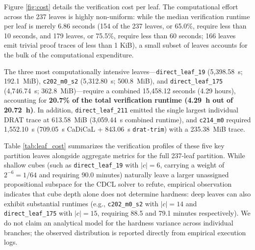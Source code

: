 \documentclass[11pt,a4paper]{article}
\theoremstyle{definition}
\begin{document}
Figure \ref{fig:cost} details the verification cost per leaf. The computational effort across the 237 leaves is highly non-uniform: while the median verification runtime per leaf is merely 6.86 seconds (154 of the 237 leaves, or 65.0\%, require less than 10 seconds, and 179 leaves, or 75.5\%, require less than 60 seconds; 166 leaves emit trivial proof traces of less than 1 KiB), a small subset of leaves accounts for the bulk of the computational expenditure. 

The three most computationally intensive leaves---\texttt{direct\_leaf\_19} (5,398.58~s; 192.1~MiB), \texttt{c202\_m0\_s2} (5,312.80~s; 500.8~MiB), and \texttt{direct\_leaf\_175} (4,746.74~s; 362.8~MiB)---require a combined 15,458.12 seconds (4.29 hours), accounting for \textbf{20.7\% of the total verification runtime (4.29~h out of 20.72~h)}. In addition, \texttt{direct\_leaf\_211} emitted the single largest individual DRAT trace at 613.58~MiB (3,059.44~s combined runtime), and \texttt{c214\_m0} required 1,552.10~s (709.05~s CaDiCaL + 843.06~s \texttt{drat-trim}) with a 235.38~MiB trace.

Table \ref{tab:leaf_cost} summarizes the verification profiles of these five key partition leaves alongside aggregate metrics for the full 237-leaf partition. While shallow cubes (such as \texttt{direct\_leaf\_19} with $|c|=6$, carrying a weight of $2^{-6} = 1/64$ and requiring 90.0 minutes) naturally leave a larger unassigned propositional subspace for the CDCL solver to refute, empirical observation indicates that cube depth alone does not determine hardness: deep leaves can also exhibit substantial runtimes (e.g., \texttt{c202\_m0\_s2} with $|c|=14$ and \texttt{direct\_leaf\_175} with $|c|=15$, requiring 88.5 and 79.1 minutes respectively). We do not claim an analytical model for the hardness variance across individual branches; the observed distribution is reported directly from empirical execution logs.
\end{document}
